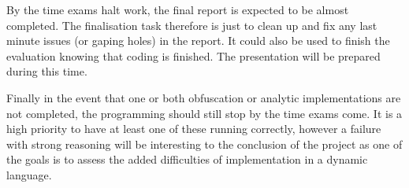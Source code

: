 \documentclass{report}
\begin{document}
By the time exams halt work, the final report is expected to be almost completed. The finalisation task therefore is just to
clean up and fix any last minute issues (or gaping holes) in the report. It could also be used to finish the evaluation knowing that
coding is finished. The presentation will be prepared during this time.

Finally in the event that one or both obfuscation or analytic implementations are not completed, the programming should still stop
by the time exams come. It is a high priority to have at least one of these running correctly, however a failure with strong reasoning
will be interesting to the conclusion of the project as one of the goals is to assess the added difficulties of implementation in
a dynamic language.



\end{document}

